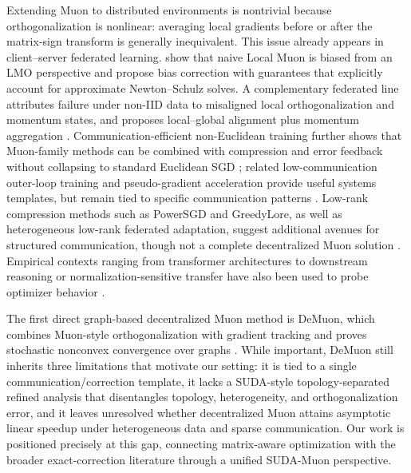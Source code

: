 \documentclass[11pt]{article}
\begin{document}
Extending Muon to distributed environments is nontrivial because orthogonalization is nonlinear: averaging local gradients before or after the matrix-sign transform is generally inequivalent. This issue already appears in client--server federated learning. \citet{Takezawa2025FedMuonFL} show that naive Local Muon is biased from an LMO perspective and propose bias correction with guarantees that explicitly account for approximate Newton--Schulz solves. A complementary federated line attributes failure under non-IID data to misaligned local orthogonalization and momentum states, and proposes local--global alignment plus momentum aggregation \citep{liu2025fedmuon}. Communication-efficient non-Euclidean training further shows that Muon-family methods can be combined with compression and error feedback without collapsing to standard Euclidean SGD \citep{Gruntkowska2025ErrorFF}; related low-communication outer-loop training and pseudo-gradient acceleration provide useful systems templates, but remain tied to specific communication patterns \citep{Th'erien2025MuLoCoMI, kallusky2025snoo}. Low-rank compression methods such as PowerSGD and GreedyLore, as well as heterogeneous low-rank federated adaptation, suggest additional avenues for structured communication, though not a complete decentralized Muon solution \citep{Vogels2019PowerSGDPL, chen2025greedy, Zhou2025ILoRAFL}. Empirical contexts ranging from transformer architectures to downstream reasoning or normalization-sensitive transfer have also been used to probe optimizer behavior \citep{Vaswani2017AttentionIA, Cobbe2021TrainingVT, wu2018group}.

The first direct graph-based decentralized Muon method is DeMuon, which combines Muon-style orthogonalization with gradient tracking and proves stochastic nonconvex convergence over graphs \citep{he2025demuon}. While important, DeMuon still inherits three limitations that motivate our setting: it is tied to a single communication/correction template, it lacks a SUDA-style topology-separated refined analysis that disentangles topology, heterogeneity, and orthogonalization error, and it leaves unresolved whether decentralized Muon attains asymptotic linear speedup under heterogeneous data and sparse communication. Our work is positioned precisely at this gap, connecting matrix-aware optimization with the broader exact-correction literature through a unified SUDA-Muon perspective.



\end{document}
